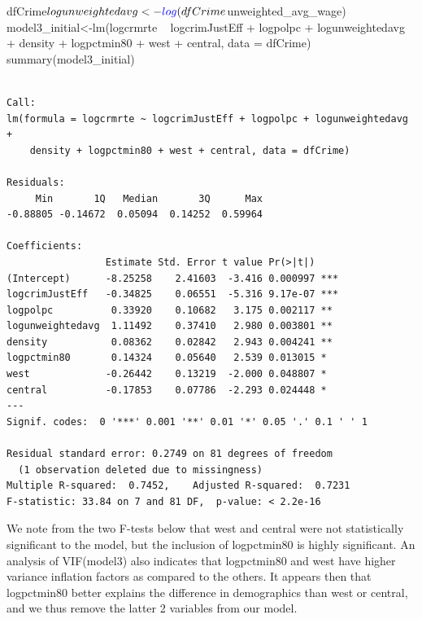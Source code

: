 \documentclass[]{article}
\newenvironment{Shaded}{}{}
\newcommand{\DataTypeTok}[1]{#1}
\newcommand{\KeywordTok}[1]{\textcolor[rgb]{0.00,0.00,1.00}{#1}}
\newcommand{\NormalTok}[1]{#1}
\newcommand{\OperatorTok}[1]{#1}
\newcommand{\StringTok}[1]{\textcolor[rgb]{0.00,0.50,0.50}{#1}}
\begin{document}
\begin{Shaded}
\begin{Highlighting}[]
\NormalTok{dfCrime}\OperatorTok{$}\NormalTok{logunweightedavg<-}\KeywordTok{log}\NormalTok{(dfCrime}\OperatorTok{$}\NormalTok{unweighted_avg_wage)}
\NormalTok{model3_initial<-}\KeywordTok{lm}\NormalTok{(logcrmrte }\OperatorTok{~}\StringTok{ }\NormalTok{logcrimJustEff }\OperatorTok{+}\StringTok{ }\NormalTok{logpolpc }\OperatorTok{+}\StringTok{ }\NormalTok{logunweightedavg }\OperatorTok{+}\StringTok{  }\NormalTok{density }\OperatorTok{+}\StringTok{ }\NormalTok{logpctmin80 }\OperatorTok{+}\StringTok{ }\NormalTok{west }\OperatorTok{+}\StringTok{ }\NormalTok{central, }\DataTypeTok{data =}\NormalTok{ dfCrime)}
\KeywordTok{summary}\NormalTok{(model3_initial)}
\end{Highlighting}
\end{Shaded}

\begin{verbatim}

Call:
lm(formula = logcrmrte ~ logcrimJustEff + logpolpc + logunweightedavg + 
    density + logpctmin80 + west + central, data = dfCrime)

Residuals:
     Min       1Q   Median       3Q      Max 
-0.88805 -0.14672  0.05094  0.14252  0.59964 

Coefficients:
                 Estimate Std. Error t value Pr(>|t|)    
(Intercept)      -8.25258    2.41603  -3.416 0.000997 ***
logcrimJustEff   -0.34825    0.06551  -5.316 9.17e-07 ***
logpolpc          0.33920    0.10682   3.175 0.002117 ** 
logunweightedavg  1.11492    0.37410   2.980 0.003801 ** 
density           0.08362    0.02842   2.943 0.004241 ** 
logpctmin80       0.14324    0.05640   2.539 0.013015 *  
west             -0.26442    0.13219  -2.000 0.048807 *  
central          -0.17853    0.07786  -2.293 0.024448 *  
---
Signif. codes:  0 '***' 0.001 '**' 0.01 '*' 0.05 '.' 0.1 ' ' 1

Residual standard error: 0.2749 on 81 degrees of freedom
  (1 observation deleted due to missingness)
Multiple R-squared:  0.7452,    Adjusted R-squared:  0.7231 
F-statistic: 33.84 on 7 and 81 DF,  p-value: < 2.2e-16
\end{verbatim}

We note from the two F-tests below that west and central were not
statistically significant to the model, but the inclusion of logpctmin80
is highly significant. An analysis of VIF(model3) also indicates that
logpctmin80 and west have higher variance inflation factors as compared
to the others. It appears then that logpctmin80 better explains the
difference in demographics than west or central, and we thus remove the
latter 2 variables from our model.
\end{document}
